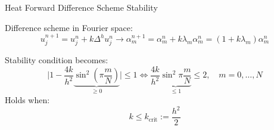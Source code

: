 \documentclass[professionalfont]{beamer}
\theoremstyle{remark}
\newcommand{\abs}[1]{\lvert#1\rvert}
\begin{document}
\begin{frame}{Heat Forward Difference Scheme Stability}

	Difference scheme in Fourier space: 
	\begin{equation*}
		u_j^{n+1}=u_j^n+k\Delta^hu_j^n\to \alpha_m^{n+1}=\alpha^n_m+k\lambda_m\alpha_m^n=(1+k\lambda_m)\alpha_m^n	
	\end{equation*}

	Stability condition becomes: 
	\begin{equation*}
		\abs{1-\frac{4k}{h^2}\underbrace{\sin^2\left( \pi\frac{m}{N} \right)}_{\ge0}}\le1\iff \frac{4k}{h^2}\underbrace{\sin^2\pi\frac{m}{N}}_{\le1}\le2,\quad m=0,\ldots,N
	\end{equation*}
	Holds when:
	\begin{equation*}
		k\le k_\text{crit}:= \frac{h^2}{2}
	\end{equation*}
	
\end{frame}
\end{document}
